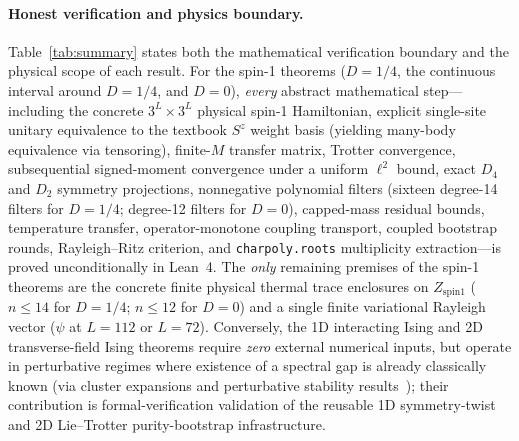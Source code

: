 \documentclass[11pt,a4paper]{article}
\newcommand{\id}[1]{{\small\nolinkurl{#1}}}
\begin{document}
\paragraph{Honest verification and physics boundary.}
Table~\ref{tab:summary} states both the mathematical verification boundary and the physical scope of each result.
For the spin-1 theorems ($D = 1/4$, the continuous interval around $D = 1/4$, and $D = 0$), \emph{every} abstract mathematical step---including the concrete $3^L\times 3^L$ physical spin-1 Hamiltonian, explicit single-site unitary equivalence to the textbook $S^z$ weight basis (yielding many-body equivalence via tensoring), finite-$M$ transfer matrix, Trotter convergence, subsequential signed-moment convergence under a uniform $\ell^2$ bound, exact $D_4$ and $D_2$ symmetry projections, nonnegative polynomial filters (sixteen degree-14 filters for $D = 1/4$; degree-12 filters for $D = 0$), capped-mass residual bounds, temperature transfer, operator-monotone coupling transport, coupled bootstrap rounds, Rayleigh--Ritz criterion, and \id{charpoly.roots} multiplicity extraction---is proved unconditionally in Lean~4.
The \emph{only} remaining premises of the spin-1 theorems are the concrete finite physical thermal trace enclosures on $Z_{\mathrm{spin1}}$ ($n \le 14$ for $D = 1/4$; $n \le 12$ for $D = 0$) and a single finite variational Rayleigh vector ($\psi$ at $L=112$ or $L=72$).
Conversely, the 1D interacting Ising and 2D transverse-field Ising theorems require \emph{zero} external numerical inputs, but operate in perturbative regimes where existence of a spectral gap is already classically known (via cluster expansions and perturbative stability results~\cite{lapalevin2021}); their contribution is formal-verification validation of the reusable 1D symmetry-twist and 2D Lie--Trotter purity-bootstrap infrastructure.
\end{document}
